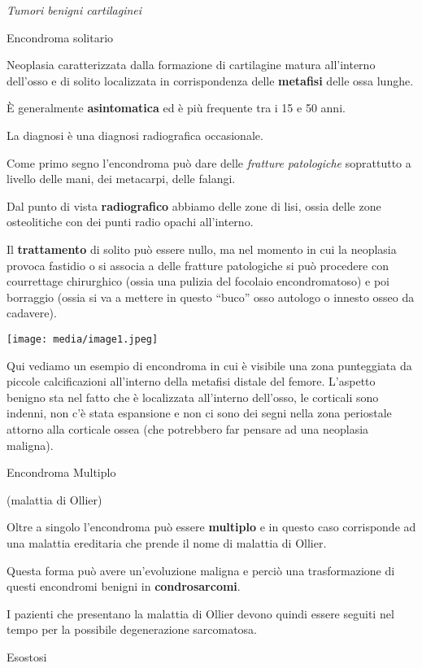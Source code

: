 

\emph{Tumori benigni cartilaginei}

Encondroma solitario

Neoplasia caratterizzata dalla formazione di cartilagine matura
all'interno dell'osso e di solito localizzata in corrispondenza delle
\textbf{metafisi} delle ossa lunghe.

È generalmente \textbf{asintomatica} ed è più frequente tra i 15 e 50
anni.

La diagnosi è una diagnosi radiografica occasionale.

Come primo segno l'encondroma può dare delle \emph{fratture patologiche}
soprattutto a livello delle mani, dei metacarpi, delle falangi.

Dal punto di vista \textbf{radiografico} abbiamo delle zone di lisi,
ossia delle zone osteolitiche con dei punti radio opachi all'interno.

Il \textbf{trattamento} di solito può essere nullo, ma nel momento in
cui la neoplasia provoca fastidio o si associa a delle fratture
patologiche si può procedere con courrettage chirurghico (ossia una
pulizia del focolaio encondromatoso) e poi borraggio (ossia si va a
mettere in questo ``buco'' osso autologo o innesto osseo da cadavere).

\texttt{[image: media/image1.jpeg]}

Qui vediamo un esempio di encondroma in cui è visibile una zona
punteggiata da piccole calcificazioni all'interno della metafisi distale
del femore. L'aspetto benigno sta nel fatto che è localizzata
all'interno dell'osso, le corticali sono indenni, non c'è stata
espansione e non ci sono dei segni nella zona periostale attorno alla
corticale ossea (che potrebbero far pensare ad una neoplasia maligna).

Encondroma Multiplo

(malattia di Ollier)

Oltre a singolo l'encondroma può essere \textbf{multiplo} e in questo
caso corrisponde ad una malattia ereditaria che prende il nome di
malattia di Ollier.

Questa forma può avere un'evoluzione maligna e perciò una trasformazione
di questi encondromi benigni in \textbf{condrosarcomi}.

I pazienti che presentano la malattia di Ollier devono quindi essere
seguiti nel tempo per la possibile degenerazione sarcomatosa.

Esostosi

